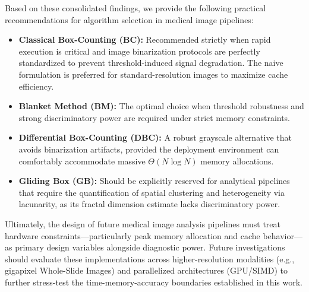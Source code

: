 Based on these consolidated findings, we provide the following practical recommendations for algorithm selection in medical image pipelines:
\begin{itemize}
    \item \textbf{Classical Box-Counting (BC):} Recommended strictly when rapid execution is critical and image binarization protocols are perfectly standardized to prevent threshold-induced signal degradation. The naive formulation is preferred for standard-resolution images to maximize cache efficiency.
    \item \textbf{Blanket Method (BM):} The optimal choice when threshold robustness and strong discriminatory power are required under strict memory constraints.
    \item \textbf{Differential Box-Counting (DBC):} A robust grayscale alternative that avoids binarization artifacts, provided the deployment environment can comfortably accommodate massive $\Theta(N \log N)$ memory allocations.
    \item \textbf{Gliding Box (GB):} Should be explicitly reserved for analytical pipelines that require the quantification of spatial clustering and heterogeneity via lacunarity, as its fractal dimension estimate lacks discriminatory power.
\end{itemize}

Ultimately, the design of future medical image analysis pipelines must treat hardware constraints—particularly peak memory allocation and cache behavior—as primary design variables alongside diagnostic power. Future investigations should evaluate these implementations across higher-resolution modalities (e.g., gigapixel Whole-Slide Images) and parallelized architectures (GPU/SIMD) to further stress-test the time-memory-accuracy boundaries established in this work.